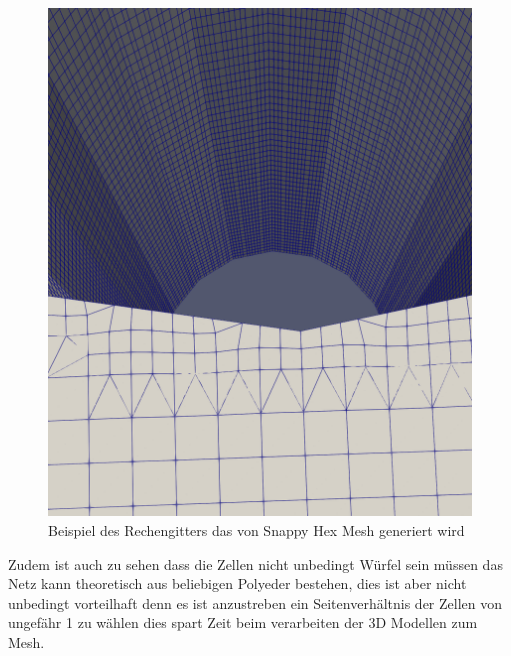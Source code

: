 \begin{figure}[h]
	\centering
	\includegraphics[scale=0.1]{papers/openfoam/Bilder/grid.png }
	\caption{Beispiel des Rechengitters das von Snappy Hex Mesh generiert wird}
	\label{openfoam:fig:sim_grid}
\end{figure}
 Zudem ist auch zu sehen dass die Zellen nicht unbedingt Würfel sein müssen das Netz kann theoretisch aus beliebigen Polyeder bestehen,  dies ist aber nicht unbedingt vorteilhaft denn es ist anzustreben ein Seitenverhältnis der Zellen von ungefähr 1 zu wählen dies spart Zeit beim verarbeiten der 3D Modellen zum Mesh.

